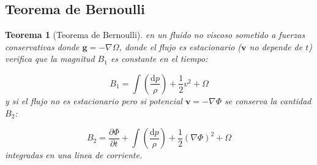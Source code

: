\documentclass[12pt,a4paper]{article}
\numberwithin{equation}{section}
\numberwithin{figure}{section}
\newcommand{\parentesis}[1]{\left( #1  \right)}
\newcommand{\parciales}[2]{\frac{\partial #1}{\partial #2}}
\newcommand{\D}{\mathrm{d}}
\newcommand{\vn}{\mathbf{v}}
\newcommand{\gn}{\mathbf{g}}
\newtheorem{theorem}{Teorema}[section]
\begin{document}
\subsection{Teorema de Bernoulli}

\begin{theorem}[Teorema de Bernoulli]
en un fluido no viscoso sometido a fuerzas conservativas donde $\gn = - \nabla \Omega$, donde el flujo es estacionario ($\vn$ no depende de $t$) verifica que la magnitud $B_1$ es constante en el tiempo:

\begin{equation}
B_1 = \int \parentesis{ \dfrac{\D p}{\rho} } + \dfrac{1}{2}v^2 + \Omega
\end{equation}
y si el flujo no es estacionario pero si potencial $\vn  = - \nabla \Phi$ se conserva la cantidad $B_2$:

\begin{equation}
B_2 = \parciales{\Phi}{t} + \int \parentesis{ \dfrac{\D p}{\rho} } + \dfrac{1}{2} (\nabla \Phi)^2 + \Omega
\end{equation}
integradas en una linea de corriente.

\end{theorem}
\end{document}
